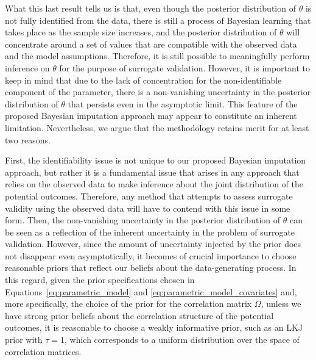 \documentclass[12pt]{article}
\begin{document}
What this last result tells us is that, even though the posterior distribution of \(\theta\) is not fully identified from the data, there is still a process of Bayesian learning that takes place as the sample size increases, and the posterior distribution of \(\theta\) will concentrate around a set of values that are compatible with the observed data and the model assumptions. Therefore, it is still possible to meaningfully perform inference on \(\theta\) for the purpose of surrogate validation. However, it is important to keep in mind that due to the lack of concentration for the non-identifiable component of the parameter, there is a non-vanishing uncertainty in the posterior distribution of \(\theta\) that persists even in the asymptotic limit. This feature of the proposed Bayesian imputation approach may appear to constitute an inherent limitation. Nevertheless, we argue that the methodology retains merit for at least two reasons.

First, the identifiability issue is not unique to our proposed Bayesian imputation approach, but rather it is a fundamental issue that arises in any approach that relies on the observed data to make inference about the joint distribution of the potential outcomes. Therefore, any method that attempts to assess surrogate validity using the observed data will have to contend with this issue in some form. Then, the non-vanishing uncertainty in the posterior distribution of \(\theta\) can be seen as a reflection of the inherent uncertainty in the problem of surrogate validation. However, since the amount of uncertainty injected by the prior does not disappear even asymptotically, it becomes of crucial importance to choose reasonable priors that reflect our beliefs about the data-generating process. In this regard, given the prior specifications chosen in Equations~\eqref{eq:parametric_model} and \eqref{eq:parametric_model_covariates} and, more specifically, the choice of the prior for the correlation matrix \(\Omega\), unless we have strong prior beliefs about the correlation structure of the potential outcomes, it is reasonable to choose a weakly informative prior, such as an LKJ prior with \(\tau = 1\), which corresponds to a uniform distribution over the space of correlation matrices.
\end{document}
